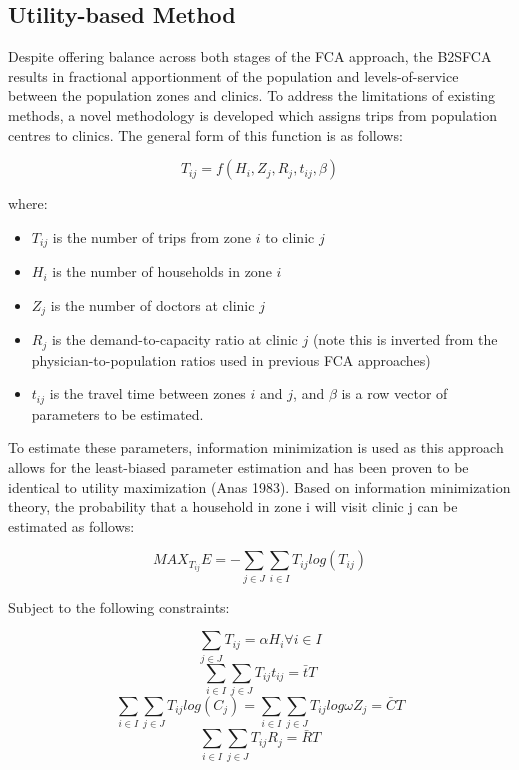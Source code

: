 \documentclass{article}
\begin{document}
\hypertarget{utility-based-method}{%
\subsection{Utility-based Method}\label{utility-based-method}}

Despite offering balance across both stages of the FCA approach, the
B2SFCA results in fractional apportionment of the population and
levels-of-service between the population zones and clinics. To address
the limitations of existing methods, a novel methodology is developed
which assigns trips from population centres to clinics. The general form
of this function is as follows:

\[
T_{ij} = f(H_i, Z_j, R_j, t_{ij}, \beta)
\]

where:

\begin{itemize}
\tightlist
\item
  \(T_{ij}\) is the number of trips from zone \(i\) to clinic \(j\)
\item
  \(H_i\) is the number of households in zone \(i\)
\item
  \(Z_j\) is the number of doctors at clinic \(j\)
\item
  \(R_j\) is the demand-to-capacity ratio at clinic \(j\) (note this is
  inverted from the physician-to-population ratios used in previous FCA
  approaches)
\item
  \(t_{ij}\) is the travel time between zones \(i\) and \(j\), and
  \(\beta\) is a row vector of parameters to be estimated.
\end{itemize}

To estimate these parameters, information minimization is used as this
approach allows for the least-biased parameter estimation and has been
proven to be identical to utility maximization (Anas 1983). Based on
information minimization theory, the probability that a household in
zone i will visit clinic j can be estimated as follows:

\[
MAX_{T_{ij}} E = -\sum_{j \in J} \sum_{i \in I} T_{ij} log(T_{ij})
\]

Subject to the following constraints:

\[
\sum_{j \in J}T_{ij} = \alpha H_i \forall i \in I 
\] \[
\sum_{i \in I} \sum_{j \in J} T_{ij} t_{ij} = \bar{t}T 
\] \[
\sum_{i \in I} \sum_{j \in J} T_{ij} log(C_j) = \sum_{i \in I} \sum_{j \in J}T_{ij} log \omega Z_j = \bar{C}T 
\] \[
\sum_{i \in I} \sum_{j \in J} T_{ij} R_j = \bar{R}T
\]
\end{document}
